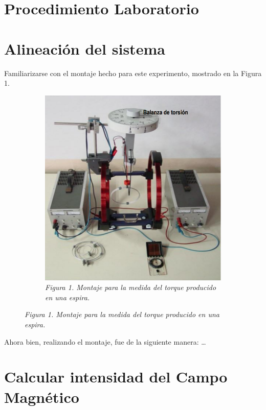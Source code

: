 \section*{Procedimiento Laboratorio}

\section{Alineación del sistema}
Familiarizarse con el montaje hecho para este
experimento, mostrado en la Figura 1.

\begin{figure}[H]
    \centering
    \begin{subfigure}[b]{0.6\textwidth}
        \centering
        \includegraphics[width=\textwidth]{Figures/0. General/1.1.png}
        \caption{\textit{Figura 1. Montaje para la medida del torque producido en una espira.}}
        \label{Figura 1}
    \end{subfigure}
\end{figure}

Ahora bien, realizando el montaje, fue de la siguiente manera:
\dots

\section{Calcular intensidad del Campo Magnético}


